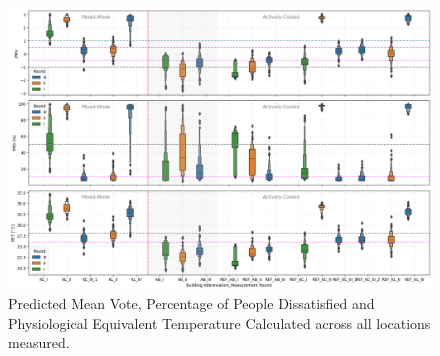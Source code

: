 \documentclass[preprint,12pt]{elsarticle}
\begin{document}



\begin{figure}[h!]
    \centering
    \includegraphics[width=0.95\linewidth]{COST_COMF.png}
    \caption{Predicted Mean Vote, Percentage of People Dissatisfied and Physiological Equivalent Temperature Calculated across all locations measured.}
    \label{fig:pmv3}
\end{figure}
\end{document}
